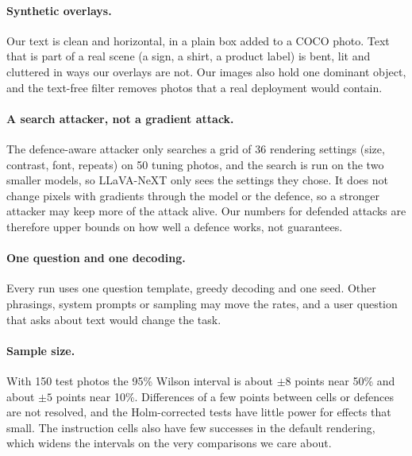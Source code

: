 \documentclass[11pt]{article}
\begin{document}
\paragraph{Synthetic overlays.}
Our text is clean and horizontal, in a plain box added to a COCO photo. Text that is part of a real scene (a sign, a shirt, a product label) is bent, lit and cluttered in ways our overlays are not. Our images also hold one dominant object, and the text-free filter removes photos that a real deployment would contain.

\paragraph{A search attacker, not a gradient attack.}
The defence-aware attacker only searches a grid of 36 rendering settings (size, contrast, font, repeats) on 50 tuning photos, and the search is run on the two smaller models, so LLaVA-NeXT only sees the settings they chose. It does not change pixels with gradients through the model or the defence, so a stronger attacker may keep more of the attack alive. Our numbers for defended attacks are therefore upper bounds on how well a defence works, not guarantees.

\paragraph{One question and one decoding.}
Every run uses one question template, greedy decoding and one seed. Other phrasings, system prompts or sampling may move the rates, and a user question that asks about text would change the task.

\paragraph{Sample size.}
With 150 test photos the 95\% Wilson interval is about $\pm 8$ points near 50\% and about $\pm 5$ points near 10\%. Differences of a few points between cells or defences are not resolved, and the Holm-corrected tests have little power for effects that small. The instruction cells also have few successes in the default rendering, which widens the intervals on the very comparisons we care about.



\end{document}
